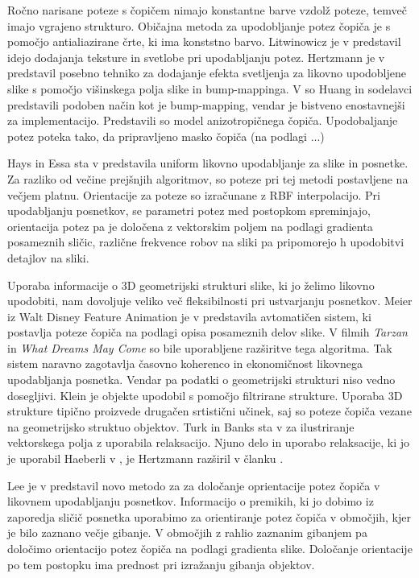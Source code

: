 Ročno narisane poteze s čopičem nimajo konstantne barve vzdolž poteze, temveč imajo vgrajeno strukturo. Običajna metoda za upodobljanje potez čopiča je s pomočjo antialiazirane črte, ki ima konststno barvo. Litwinowicz je v \cite{Litwinowicz:VideoImpressionist} predstavil idejo dodajanja teksture in svetlobe pri upodabljanju potez. Hertzmann je v \cite{Hertzmann:Texture} predstavil posebno tehniko za dodajanje efekta svetljenja za likovno upodobljene slike s pomočjo višinskega polja slike in bump-mappinga. %
V \cite{Huang:Natural} so Huang in sodelavci predstavili podoben način kot je bump-mapping, vendar je bistveno enostavnejši za implementacijo. Predstavili so model anizotropičnega čopiča. Upodobaljanje potez poteka tako, da pripravljeno masko čopiča (na podlagi ...)%

Hays in Essa sta v \cite{Hays:Animation} predstavila uniform %
likovno upodabljanje za slike in posnetke. Za razliko od večine prejšnjih algoritmov, so poteze pri tej metodi postavljene na večjem platnu. Orientacije za poteze so izračunane z RBF interpolacijo. Pri upodabljanju posnetkov, se parametri potez med postopkom spreminjajo, orientacija potez pa je določena z vektorskim poljem na podlagi gradienta posameznih sličic, različne frekvence robov na sliki pa pripomorejo h upodobitvi detajlov na sliki.


Uporaba informacije o 3D geometrijski strukturi slike, ki jo želimo likovno upodobiti, nam dovoljuje veliko več fleksibilnosti pri ustvarjanju posnetkov. Meier iz Walt Disney Feature Animation je %
v \cite{Meier:Animation} predstavila avtomatičen sistem, ki postavlja poteze čopiča na podlagi opisa posameznih delov slike. %
V filmih \textit{Tarzan} \cite{Daniels:Tarzan} in \textit{What Dreams May Come} %
so bile uporabljene razširitve tega algoritma.  Tak sistem naravno zagotavlja časovno koherenco in ekonomičnost likovnega upodabljanja posnetka. Vendar pa podatki o geometrijski strukturi niso vedno dosegljivi. Klein \cite{Klein:Virtual} je objekte upodobil s pomočjo filtrirane strukture. %
Uporaba 3D strukture tipično proizvede drugačen srtistični učinek, saj so poteze čopiča vezane na geometrijsko struktuo objektov. Turk in Banks sta v \cite{Turk:Guided} za ilustriranje vektorskega polja z uporabila relaksacijo. Njuno delo in uporabo relaksacije, ki jo je uporabil Haeberli v \cite{Haeberli:PaintNumbers}, je Hertzmann razširil v članku \cite{Hertzmann:Relaxation}.

Lee je v \cite{Lee:Motion} predstavil novo metodo za za določanje oprientacije potez čopiča v likovnem upodabljanju posnetkov. Informacijo o premikih, ki jo dobimo iz zaporedja sličič posnetka uporabimo za orientiranje potez čopiča v območjih, kjer je bilo zaznano večje gibanje. %
V območjih z rahlio zaznanim gibanjem pa določimo orientacijo potez čopiča na podlagi gradienta slike. %
Določanje orientacije po tem postopku ima prednost pri izražanju gibanja objektov. 